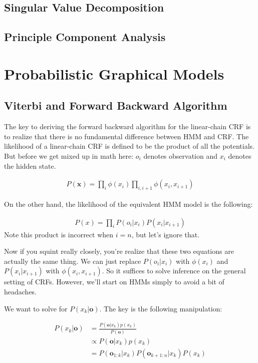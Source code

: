 \documentclass[12pt]{article}
\newcommand{\eq}[1]{\begin{align*}#1\end{align*}}
\begin{document}
\subsection{Singular Value Decomposition}

\subsection{Principle Component Analysis}

\section{Probabilistic Graphical Models}

\subsection{Viterbi and Forward Backward Algorithm}

\renewcommand{\o}{\mathbf{o}}
\newcommand{\x}{\mathbf{x}}

The key to deriving the forward backward algorithm for the linear-chain CRF is to realize that there is no fundamental difference between HMM and CRF.
The likelihood of a linear-chain CRF is defined to be the product of all the potentials. But before we get mixed up in math here: $o_i$ denotes observation and $x_i$ denotes the hidden state.

\eq{
P(\x) = \prod_i \phi(x_i) \prod_{i,i+1} \phi(x_i, x_{i+1})
}

On the other hand, the likelihood of the equivalent HMM model is the following:

\eq{
P(x) = \prod_i P(o_i | x_i) P(x_i | x_{i+1})
}
Note this product is incorrect when $i = n$, but let's ignore that.

Now if you squint really closely, you're realize that these two equations are actually the same thing. We can just replace $P(o_i|x_i)$ with $\phi(x_i)$ and $P(x_i|x_{i+1})$ with $\phi(x_i, x_{i+1})$. So it suffices to solve inference on the general setting of CRFs. However, we'll start on HMMs simply to avoid a bit of headaches.

We want to solve for $P(x_k|\o)$. The key is the following manipulation:

\eq{
  P(x_k|\o) &= \frac{P(\o|x_k)p(x_k)}{P(\o)} \\
  &\propto P(\o|x_k)p(x_k) \\
  &= P(\o_{1:k}|x_k)P(\o_{k+1:n}|x_k)P(x_k) \\
}
\end{document}
